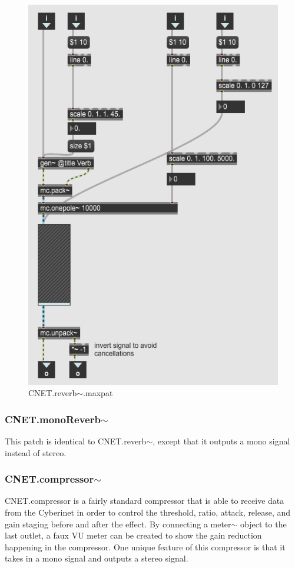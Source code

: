 \begin{figure}
    \centering
    \includegraphics{diagrams/maxPatches/CNET.reverb~.png}
    \caption{CNET.reverb$\sim$.maxpat}
    \label{fig:my_label}
\end{figure}

\subsubsection{CNET.monoReverb$\sim$}
This patch is identical to CNET.reverb$\sim$, except that it outputs a mono signal instead of stereo.

\subsubsection{CNET.compressor$\sim$}
CNET.compressor is a fairly standard compressor that is able to receive data from the Cyberinet in order to control the threshold, ratio, attack, release, and gain staging before and after the effect. By connecting a meter$\sim$ object to the last outlet, a faux VU meter can be created to show the gain reduction happening in the compressor. One unique feature of this compressor is that it takes in a mono signal and outputs a stereo signal.

